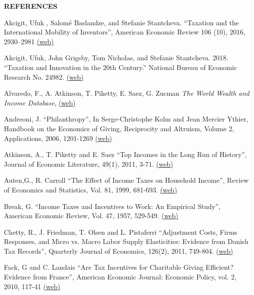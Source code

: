 \documentclass[landscape]{slides}
\begin{document}
\begin{slide}
\begin{center}
{\bf REFERENCES}
\end{center}
{\small

Akcigit, Ufuk , Salom\'e Baslandze, and Stefanie Stantcheva. ``Taxation and the International Mobility of Inventors'',
American Economic Review 106 (10), 2016, 2930--2981 \href{http://elsa.berkeley.edu/~saez/course/Akcigit_Baslandze_Stantcheva_Taxation_Superstars.pdf} {(web)}

Akcigit, Ufuk, John Grigsby, Tom Nicholas, and Stefanie Stantcheva. 2018. ``Taxation and Innovation in the 20th Century.'' National Bureau of Economic Research No. 24982.
\href{https://www.nber.org/papers/w24982.pdf} {(web)}

Alvaredo, F., A. Atkinson, T. Piketty, E. Saez, G. Zucman \emph{The World Wealth and Income Database},
\href{http://www.wid.world/} {(web)}

Andreoni, J. ``Philanthropy'', In Serge-Christophe Kolm and Jean Mercier Ythier, Handbook on the Economics of Giving, Reciprocity and Altruism, Volume 2, Applications, 2006, 1201-1269 \href{http://elsa.berkeley.edu/~saez/course/Andereoni_Handbook chapter.pdf} {(web)}

Atkinson, A., T. Piketty and E. Saez ``Top Incomes in the Long Run of History'', Journal of Economic Literature, 49(1), 2011, 3-71. \href{http://elsa.berkeley.edu/~saez/atkinson-piketty-saezJEL10.pdf} {(web)}

Auten,G., R. Carroll ``The Effect of Income Taxes on Household Income'', Review of Economics and Statistics, Vol. 81, 1999, 681-693. \href{http://www.jstor.org/stable/pdfplus/2646717.pdf} {(web)}

Break, G. ``Income Taxes and Incentives to Work: An Empirical Study'', American Economic Review, Vol. 47, 1957, 529-549. \href{http://links.jstor.org/stable/pdfplus/1811736.pdf} {(web)}

Chetty, R., J. Friedman, T. Olsen and L. Pistaferri ``Adjustment Costs, Firms
Responses, and Micro vs. Macro Labor Supply Elasticities: Evidence from Danish Tax
Records'', Quarterly Journal of Economics,  126(2), 2011, 749-804. \href{http://elsa.berkeley.edu/~saez/course/chettyetalQJE2011denmark.pdf} {(web)} 

Fack, G and C. Landais ``Are Tax Incentives for Charitable Giving Efficient? Evidence from France'', American Economic Journal: Economic Policy, vol. 2, 2010, 117-41 \href{http://elsa.berkeley.edu/~saez/course/Fack and Landais(2010).pdf} {(web)}

}
\end{slide}
\end{document}
